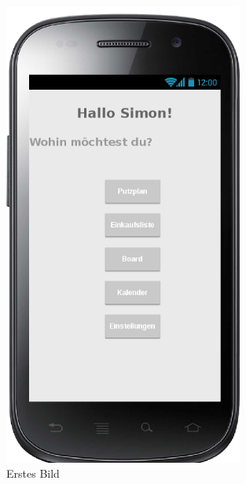 \begin{figure}[htbp] 
  \centering
     \includegraphics[width=0.7\textwidth]{anhang/mockups/overview.png}
  \caption{Erstes Bild}
  \label{fig:Bild1}
\end{figure}

